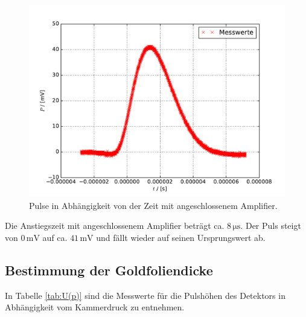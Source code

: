 \begin{figure}[H]
  \centering
  \includegraphics[width=\textwidth]{osz1.pdf}
  \caption{Pulse in Abhängigkeit von der Zeit mit angeschlossenem Amplifier.}
  \label{fig:1}
\end{figure}

Die Anstiegszeit mit angeschlossenem Amplifier beträgt ca. $8\,\si{\micro\second}$.
Der Puls steigt von $0\,\text{mV}$ auf ca. $41\,\text{mV}$ und fällt wieder auf seinen Ursprungswert ab.

\subsection{Bestimmung der Goldfoliendicke}
In Tabelle \ref{tab:U(p)} sind die Messwerte für die Pulshöhen des Detektors in Abhängigkeit vom Kammerdruck zu entnehmen.

